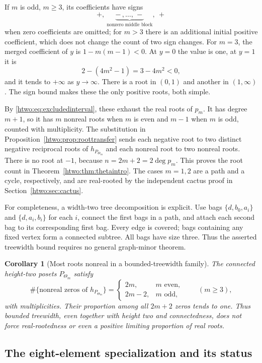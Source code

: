 \documentclass[11pt]{article}
\numberwithin{equation}{section}
\newtheorem{corollary}[theorem]{Corollary}
\theoremstyle{definition}
\begin{document}
If $m$ is odd, $m\ge3$, its coefficients have signs
\[
 +,\ \underbrace{-\,,\ldots,\,-}_{\text{nonzero middle block}},\ +
\]
when zero coefficients are omitted; for $m>3$ there is an additional
initial positive coefficient, which does not change the count of two sign
changes. For $m=3$, the merged coefficient of $y$ is $1-m(m-1)<0$.
At $y=0$ the value is one, at $y=1$ it is
\[
 2-(4m^2-1)=3-4m^2<0,
\]
and it tends to $+\infty$ as $y\to\infty$. There is a root in $(0,1)$
and another in $(1,\infty)$. The sign bound makes these the only positive
roots, both simple.

By \eqref{htwo:eq:excludedinterval}, these exhaust the real roots of $p_m$.
It has degree $m+1$, so it has $m$ nonreal roots when $m$ is even and
$m-1$ when $m$ is odd, counted with multiplicity. The substitution in
Proposition~\ref{htwo:prop:roottransfer} sends each negative root to two distinct
negative reciprocal roots of $h_{P_{\Theta_m}}$ and each nonreal root to
two nonreal roots. There is no root at $-1$, because
$n=2m+2=2\deg p_m$. This proves the root count in
Theorem~\ref{htwo:thm:thetaintro}. The cases $m=1,2$ are a path and a cycle,
respectively, and are real-rooted by the independent cactus proof in
Section~\ref{htwo:sec:cactus}.

For completeness, a width-two tree decomposition is explicit. Use bags
$\{d,b_0,a_i\}$ and $\{d,a_i,b_i\}$ for each $i$, connect the first bags
in a path, and attach each second bag to its corresponding first bag.
Every edge is covered; bags containing any fixed vertex form a connected
subtree. All bags have size three. Thus the asserted treewidth bound
requires no general graph-minor theorem.

\begin{corollary}[Most roots nonreal in a bounded-treewidth family]\label{htwo:cor:nonreal}
The connected height-two posets $P_{\Theta_m}$ satisfy
\[
 \#\{\text{nonreal zeros of }h_{P_{\Theta_m}}\}
 =\begin{cases}2m,&m\text{ even},\\2m-2,&m\text{ odd},\end{cases}
 \qquad(m\ge3),
\]
with multiplicities. Their proportion among all $2m+2$ zeros tends to one.
Thus bounded treewidth, even together with height two and connectedness,
does not force real-rootedness or even a positive limiting proportion of
real roots.
\end{corollary}

\subsection{The eight-element specialization and its status}
\end{document}
